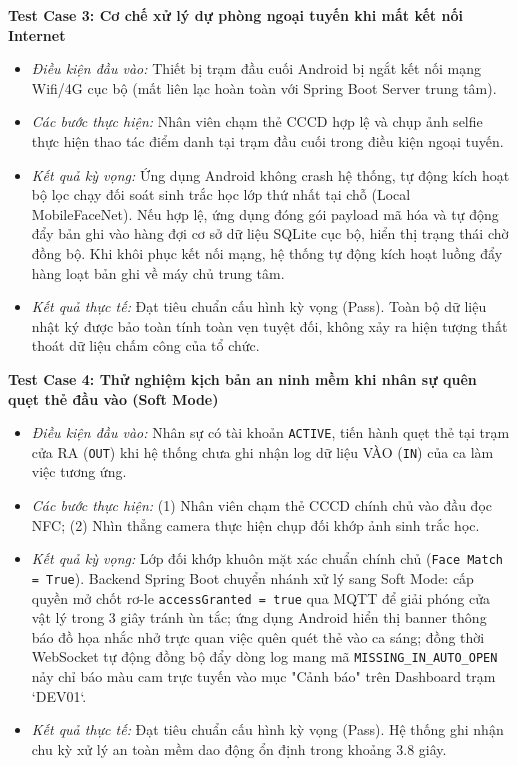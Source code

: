 ﻿\documentclass[../DoAn.tex]{subfiles}
\begin{document}
\textbf{Test Case 3: Cơ chế xử lý dự phòng ngoại tuyến khi mất kết nối Internet}
\begin{itemize}
    \item \textit{Điều kiện đầu vào:} Thiết bị trạm đầu cuối Android bị ngắt kết nối mạng Wifi/4G cục bộ (mất liên lạc hoàn toàn với Spring Boot Server trung tâm).
    \item \textit{Các bước thực hiện:} Nhân viên chạm thẻ CCCD hợp lệ và chụp ảnh selfie thực hiện thao tác điểm danh tại trạm đầu cuối trong điều kiện ngoại tuyến.
    \item \textit{Kết quả kỳ vọng:} Ứng dụng Android không crash hệ thống, tự động kích hoạt bộ lọc chạy đối soát sinh trắc học lớp thứ nhất tại chỗ (Local MobileFaceNet). Nếu hợp lệ, ứng dụng đóng gói payload mã hóa và tự động đẩy bản ghi vào hàng đợi cơ sở dữ liệu SQLite cục bộ, hiển thị trạng thái chờ đồng bộ. Khi khôi phục kết nối mạng, hệ thống tự động kích hoạt luồng đẩy hàng loạt bản ghi về máy chủ trung tâm.
    \item \textit{Kết quả thực tế:} Đạt tiêu chuẩn cấu hình kỳ vọng (Pass). Toàn bộ dữ liệu nhật ký được bảo toàn tính toàn vẹn tuyệt đối, không xảy ra hiện tượng thất thoát dữ liệu chấm công của tổ chức.
\end{itemize}

\textbf{Test Case 4: Thử nghiệm kịch bản an ninh mềm khi nhân sự quên quẹt thẻ đầu vào (Soft Mode)}
\begin{itemize}
    \item \textit{Điều kiện đầu vào:} Nhân sự có tài khoản \texttt{ACTIVE}, tiến hành quẹt thẻ tại trạm cửa RA (\texttt{OUT}) khi hệ thống chưa ghi nhận log dữ liệu VÀO (\texttt{IN}) của ca làm việc tương ứng.
    \item \textit{Các bước thực hiện:} (1) Nhân viên chạm thẻ CCCD chính chủ vào đầu đọc NFC; (2) Nhìn thẳng camera thực hiện chụp đối khớp ảnh sinh trắc học.
    \item \textit{Kết quả kỳ vọng:} Lớp đối khớp khuôn mặt xác chuẩn chính chủ (\texttt{Face Match = True}). Backend Spring Boot chuyển nhánh xử lý sang Soft Mode: cấp quyền mở chốt rơ-le \texttt{accessGranted = true} qua MQTT để giải phóng cửa vật lý trong 3 giây tránh ùn tắc; ứng dụng Android hiển thị banner thông báo đồ họa nhắc nhở trực quan việc quên quét thẻ vào ca sáng; đồng thời WebSocket tự động đồng bộ đẩy dòng log mang mã \texttt{MISSING\_IN\_AUTO\_OPEN} nảy chỉ báo màu cam trực tuyến vào mục "Cảnh báo" trên Dashboard trạm `DEV01`.
    \item \textit{Kết quả thực tế:} Đạt tiêu chuẩn cấu hình kỳ vọng (Pass). Hệ thống ghi nhận chu kỳ xử lý an toàn mềm dao động ổn định trong khoảng 3.8 giây.
\end{itemize}
\end{document}
